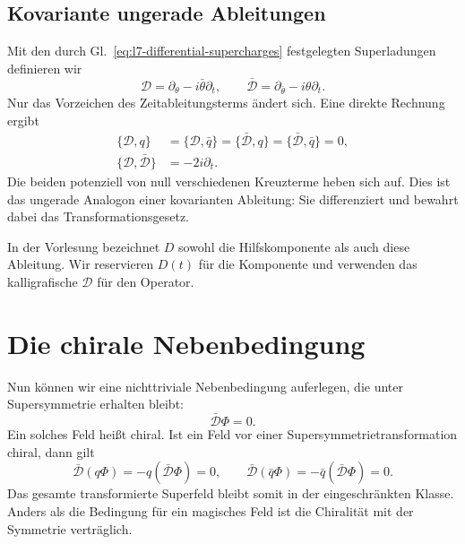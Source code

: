 \begin{classroomqa}
\end{classroomqa}

\subsection{Kovariante ungerade Ableitungen}

Mit den durch Gl.~\eqref{eq:l7-differential-supercharges} festgelegten Superladungen definieren wir
\begin{equation}
\mathcal D=\partial_\theta-i\bar\theta\partial_t,
\qquad
\bar{\mathcal D}=\partial_{\bar\theta}-i\theta\partial_t.
\label{eq:l7-covariant-derivatives}
\end{equation}
Nur das Vorzeichen des Zeitableitungsterms ändert sich. Eine direkte Rechnung ergibt
\begin{align}
\{\mathcal D,q\}
&=\{\mathcal D,\bar q\}
=\{\bar{\mathcal D},q\}
=\{\bar{\mathcal D},\bar q\}=0,\\
\{\mathcal D,\bar{\mathcal D}\}&=-2i\partial_t.
\label{eq:l7-covariant-algebra}
\end{align}
Die beiden potenziell von null verschiedenen Kreuzterme heben sich auf. Dies ist das ungerade Analogon einer kovarianten Ableitung: Sie differenziert und bewahrt dabei das Transformationsgesetz.

In der Vorlesung bezeichnet \(D\) sowohl die Hilfskomponente als auch diese Ableitung. Wir reservieren \(D(t)\) für die Komponente und verwenden das kalligrafische \(\mathcal D\) für den Operator.

\section{Die chirale Nebenbedingung}

Nun können wir eine nichttriviale Nebenbedingung auferlegen, die unter Supersymmetrie erhalten bleibt:
\begin{equation}
\bar{\mathcal D}\Phi=0.
\label{eq:l7-chiral-constraint}
\end{equation}
Ein solches Feld heißt chiral. Ist ein Feld vor einer Supersymmetrietransformation chiral, dann gilt
\begin{equation}
\bar{\mathcal D}(q\Phi)
=-q(\bar{\mathcal D}\Phi)=0,
\qquad
\bar{\mathcal D}(\bar q\Phi)
=-\bar q(\bar{\mathcal D}\Phi)=0.
\end{equation}
Das gesamte transformierte Superfeld bleibt somit in der eingeschränkten Klasse. Anders als die Bedingung für ein magisches Feld ist die Chiralität mit der Symmetrie verträglich.

